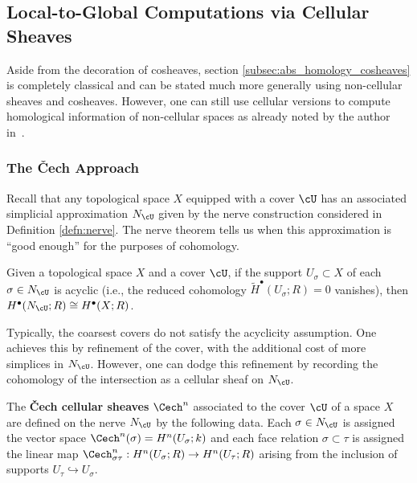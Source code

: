 \subsection{Local-to-Global Computations via Cellular Sheaves}
\label{subsec:local-to-global}

Aside from the decoration of cosheaves, section \ref{subsec:abs_homology_cosheaves} is completely classical and can be stated much more generally using non-cellular sheaves and cosheaves. However, one can still use cellular versions to compute homological information of non-cellular spaces as already noted by the author in~\cite{DMT_sheaves}.

\subsubsection{The \v{C}ech Approach}

Recall that any topological space $X$ equipped with a cover $\cU$ has an associated simplicial approximation $N_{\cU}$ given by the nerve construction considered in Definition \ref{defn:nerve}. The nerve theorem tells us when this approximation is ``good enough'' for the purposes of cohomology.

\begin{thm}
Given a topological space $X$ and a cover $\cU$, if the support $U_\sigma \subset X$ of each $\sigma \in N_\cU$ is acyclic (i.e., the reduced cohomology $\tilde{H}^\bullet(U_\sigma;R) = 0$ vanishes),
then $H^\bullet(N_\cU;R)\cong H^\bullet(X;R)$.
\end{thm}

Typically, the coarsest covers do not satisfy the acyclicity assumption. One achieves this by refinement of the cover, with the additional cost of more simplices in $N_{\cU}$. However, one can dodge this refinement by recording the cohomology of the intersection as a cellular sheaf on $N_{\cU}$.

\begin{defn}

The {\bf \v{C}ech cellular sheaves} $\Cech^n$ associated to the cover $\cU$ of a space $X$ are defined on the nerve $N_\cU$ by the following data. Each $\sigma \in N_\cU$ is assigned the vector space $\Cech^n(\sigma) = H^n(U_{\sigma};k)$ and each face relation $\sigma \subset \tau$ is assigned the linear map $\Cech^n_{\sigma\tau}: H^n(U_{\sigma};R)\to H^n(U_{\tau};R)$ arising from the inclusion of supports $U_\tau \hookrightarrow U_\sigma$.

\end{defn}

